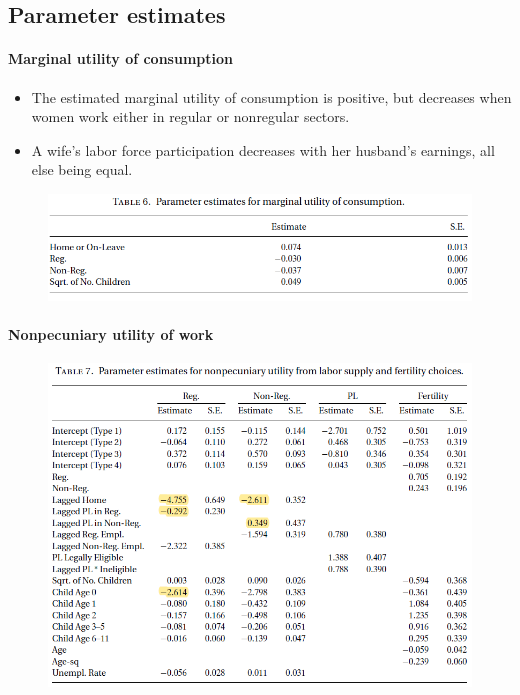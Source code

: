 \documentclass[../root]{subfiles}
\begin{document}
    \subsection{Parameter estimates}

    \paragraph{Marginal utility of consumption}

    \begin{itemize}
      \item The estimated marginal utility of consumption is positive, but decreases when women work either in regular or nonregular sectors.
      \item A wife’s labor force participation decreases with her husband’s earnings, all else being equal.
    \end{itemize}

    \begin{figure}[h]
      \centering
      \includegraphics[scale = 1]{0619tanji/T6}
      \label{T5}
    \end{figure}

    \paragraph{Nonpecuniary utility of work}

    \begin{figure}[h]
      \centering
      \includegraphics[scale = 1]{0619tanji/T7}
      \label{T6}
    \end{figure}
\end{document}
